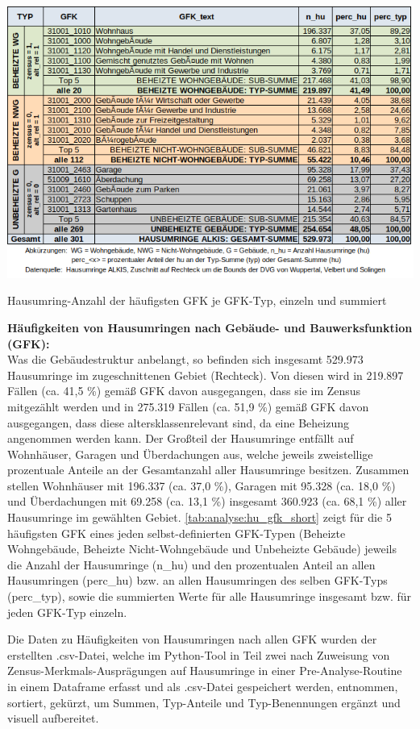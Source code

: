 		\begin{table}[H]
			\includegraphics[width=\textwidth]{Medien/tables/hu_gfk_analysis_short.png}
			\caption{Hausumring-Anzahl der häufigsten GFK je GFK-Typ, einzeln und summiert}
			\label{tab:analyse:hu_gfk_short}
		\end{table}
	
		\textbf{Häufigkeiten von Hausumringen nach Gebäude- und Bauwerksfunktion (GFK):}\\
		Was die Gebäudestruktur anbelangt, so befinden sich insgesamt 529.973 Hausumringe im zugeschnittenen Gebiet (Rechteck). Von diesen wird in 219.897 Fällen (ca. 41,5 \%) gemäß GFK davon ausgegangen, dass sie im Zensus mitgezählt werden und in 275.319 Fällen (ca. 51,9 \%) gemäß GFK davon ausgegangen, dass diese altersklassenrelevant sind, da eine Beheizung angenommen werden kann. Der Großteil der Hausumringe entfällt auf Wohnhäuser, Garagen und Überdachungen aus, welche jeweils zweistellige prozentuale Anteile an der Gesamtanzahl aller Hausumringe besitzen. Zusammen stellen Wohnhäuser mit 196.337 (ca. 37,0 \%), Garagen mit 95.328
		(ca. 18,0 \%) und Überdachungen mit 69.258 (ca. 13,1 \%) insgesamt 360.923 (ca. 68,1 \%) aller Hausumringe im gewählten Gebiet. \autoref{tab:analyse:hu_gfk_short} zeigt für die 5 häufigsten GFK eines jeden selbst-definierten GFK-Typen (Beheizte Wohngebäude, Beheizte Nicht-Wohngebäude und Unbeheizte Gebäude) jeweils die Anzahl der Hausumringe (n\_hu) und den prozentualen Anteil an allen Hausumringen (perc\_hu) bzw. an allen Hausumringen des selben GFK-Typs (perc\_typ), sowie die summierten Werte für alle Hausumringe insgesamt bzw. für jeden GFK-Typ einzeln. 
		
		Die Daten zu Häufigkeiten von Hausumringen nach allen GFK wurden der erstellten .csv-Datei, welche im Python-Tool in Teil zwei nach Zuweisung von Zensus-Merkmals-Ausprägungen auf Hausumringe in einer Pre-Analyse-Routine in einem Dataframe erfasst und als .csv-Datei gespeichert werden, entnommen, sortiert, gekürzt, um Summen, Typ-Anteile und Typ-Benennungen ergänzt und visuell aufbereitet.
	
